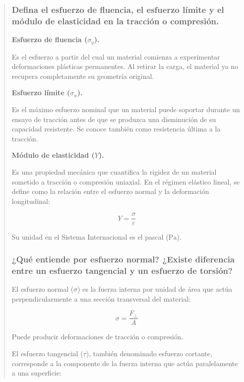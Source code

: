 \documentclass[11pt,a4paper]{article}
\begin{document}
\begin{quote}
\subsubsection{Defina el esfuerzo de fluencia,
el esfuerzo límite y el módulo de elasticidad
en la tracción o compresión.}

\medskip

\noindent\textbf{Esfuerzo de fluencia ($\sigma_y$).}

Es el esfuerzo a partir del cual un material comienza
a experimentar deformaciones plásticas permanentes.
Al retirar la carga, el material ya no recupera
completamente su geometría original.

\medskip

\noindent\textbf{Esfuerzo límite ($\sigma_u$).}

Es el máximo esfuerzo nominal que un material puede
soportar durante un ensayo de tracción antes de que
se produzca una disminución de su capacidad resistente.
Se conoce también como resistencia última a la tracción.

\medskip

\noindent\textbf{Módulo de elasticidad ($Y$).}

Es una propiedad mecánica que cuantifica la rigidez
de un material sometido a tracción o compresión
uniaxial. En el régimen elástico lineal, se define
como la relación entre el esfuerzo normal y la
deformación longitudinal:

\begin{equation}
    \boxed{Y=\frac{\sigma}{\varepsilon}}
\end{equation}

Su unidad en el Sistema Internacional es el pascal
($\mathrm{Pa}$).

\subsubsection{¿Qué entiende por esfuerzo normal?
¿Existe diferencia entre un esfuerzo tangencial
y un esfuerzo de torsión?}

El esfuerzo normal ($\sigma$) es la fuerza interna
por unidad de área que actúa perpendicularmente
a una sección transversal del material:

\begin{equation}
    \boxed{\sigma=\frac{F_{\perp}}{A}}
\end{equation}

Puede producir deformaciones de tracción o compresión.

El esfuerzo tangencial ($\tau$), también denominado
esfuerzo cortante, corresponde a la componente
de la fuerza interna que actúa paralelamente
a una superficie:


\end{quote}
\end{document}
